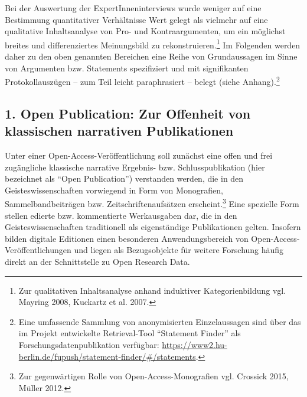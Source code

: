 \documentclass[a4paper,
fontsize=11pt,
oneside,
numbers=noperiodatend,
parskip=half-,
bibliography=totoc,
final
]{scrartcl}
\begin{document}
Bei der Auswertung der ExpertInneninterviews wurde weniger auf eine
Bestimmung quantitativer Verhältnisse Wert gelegt als vielmehr auf eine
qualitative Inhaltsanalyse von Pro- und Kontraargumenten, um ein
möglichst breites und differenziertes Meinungsbild zu
rekonstruieren.\footnote{Zur qualitativen Inhaltsanalyse anhand
  induktiver Kategorienbildung vgl. Mayring 2008, Kuckartz et al. 2007.}
Im Folgenden werden daher zu den oben genannten Bereichen eine Reihe von
Grundaussagen im Sinne von Argumenten bzw. Statements spezifiziert und
mit signifikanten Protokollauszügen -- zum Teil leicht paraphrasiert --
belegt (siehe Anhang).\footnote{Eine umfassende Sammlung von
  anonymisierten Einzelaussagen sind über das im Projekt entwickelte
  Retrieval-Tool \enquote{Statement Finder} als
  Forschungsdatenpublikation verfügbar:
  \url{https://www2.hu-berlin.de/fupush/statement-finder/\#/statements}.}

\subsection{1. Open Publication: Zur Offenheit von klassischen
narrativen
Publikationen}\label{open-publication-zur-offenheit-von-klassischen-narrativen-publikationen}

Unter einer Open-Access-Veröffentlichung soll zunächst eine offen und
frei zugängliche klassische narrative Ergebnis- bzw. Schlusspublikation
(hier bezeichnet als \enquote{Open Publication}) verstanden werden, die
in den Geisteswissenschaften vorwiegend in Form von Monografien,
Sammelbandbeiträgen bzw. Zeitschriftenaufsätzen erscheint.\footnote{Zur
  gegenwärtigen Rolle von Open-Access-Monografien vgl. Crossick 2015,
  Müller 2012.} Eine spezielle Form stellen edierte bzw. kommentierte
Werkausgaben dar, die in den Geisteswissenschaften traditionell als
eigenständige Publikationen gelten. Insofern bilden digitale Editionen
einen besonderen Anwendungsbereich von Open-Access-Veröffentlichungen
und liegen als Bezugsobjekte für weitere Forschung häufig direkt an der
Schnittstelle zu Open Research Data.
\end{document}
